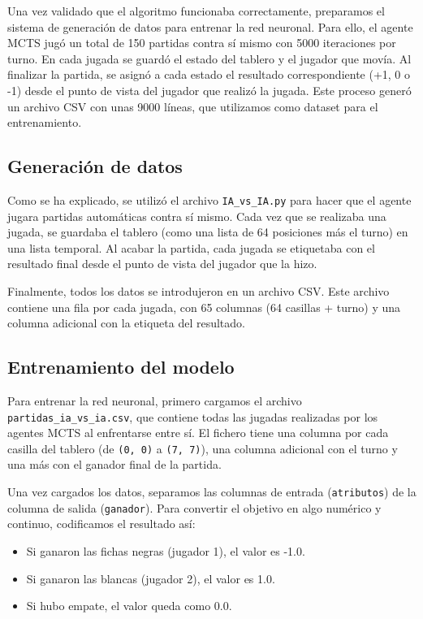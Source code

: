 \documentclass[conference]{IEEEtran}
\begin{document}
Una vez validado que el algoritmo funcionaba correctamente, preparamos el sistema de generación de datos para entrenar la red neuronal. Para ello, el agente MCTS jugó un total de 150 partidas contra sí mismo con 5000 iteraciones por turno. En cada jugada se guardó el estado del tablero y el jugador que movía. Al finalizar la partida, se asignó a cada estado el resultado correspondiente (+1, 0 o -1) desde el punto de vista del jugador que realizó la jugada. Este proceso generó un archivo CSV con unas 9000 líneas, que utilizamos como dataset para el entrenamiento.

\subsection{Generación de datos}
Como se ha explicado, se utilizó el archivo \texttt{IA\_vs\_IA.py} para hacer que el agente jugara partidas automáticas contra sí mismo. Cada vez que se realizaba una jugada, se guardaba el tablero (como una lista de 64 posiciones más el turno) en una lista temporal. Al acabar la partida, cada jugada se etiquetaba con el resultado final desde el punto de vista del jugador que la hizo.

Finalmente, todos los datos se introdujeron en un archivo CSV. Este archivo contiene una fila por cada jugada, con 65 columnas (64 casillas + turno) y una columna adicional con la etiqueta del resultado.

\subsection{Entrenamiento del modelo}
Para entrenar la red neuronal, primero cargamos el archivo \texttt{partidas\_ia\_vs\_ia.csv}, que contiene todas las jugadas realizadas por los agentes MCTS al enfrentarse entre sí. El fichero tiene una columna por cada casilla del tablero (de \texttt{(0, 0)} a \texttt{(7, 7)}), una columna adicional con el turno y una más con el ganador final de la partida.

Una vez cargados los datos, separamos las columnas de entrada (\texttt{atributos}) de la columna de salida (\texttt{ganador}). Para convertir el objetivo en algo numérico y continuo, codificamos el resultado así:
\begin{itemize}
    \item Si ganaron las fichas negras (jugador 1), el valor es -1.0.
    \item Si ganaron las blancas (jugador 2), el valor es 1.0.
    \item Si hubo empate, el valor queda como 0.0.
\end{itemize}
\end{document}
